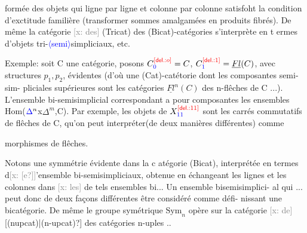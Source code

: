 \documentclass[11pt]{article}
\newcommand{\scanpage}[1]{\par\bigskip\noindent{\small\sffamily[scan #1]}\par}
\newcommand{\mspage}[1]{{\small\sffamily[p.\,#1]}}
\newcommand{\hand}[1]{\textcolor{blue}{#1}}
\newcommand{\inserted}[2][]{\textcolor{blue}{$\langle$#2$\rangle$}}
\newcommand{\deleted}[1]{\textcolor{red}{[\textsf{del.:} #1]}}
\newcommand{\xout}[1]{\textcolor{gray}{[\textsf{x:} #1]}}
\newcommand{\unsure}[1]{[#1?]}
\begin{document}
formée des objets qui ligne par ligne et colonne par colonne satisfoht la
condition d'exctitude familière (transformer sommes amalgamées en produits
fibrés). De même la catégorie \xout{des} (Tricat) des (Bicat)-catégories
s'interprète en t ermes d'objets tri-\inserted[typed]{semi}simpliciaux, etc.

Exemple: soit C une catégorie, posons $C^{\deleted{o}}_{\hand{0}}=C$, $C^{\deleted{1}}_{\hand{1}}=\underline{Fl}(C)$, avec structures
$p_1,p_2$, évidentes (d'où une (Cat)-catétorie dont les composantes semi-sim-%
pliciales supérieures sont les catégories $\underline{Fl}^n(C)$ des n-flêches de C ...).
L'ensemble bi-semisimplicial correspondant a pour composantes les ensembles
Hom($\hand{\Delta}^n$x$\Delta^m$,C). Par exemple, les objets de $X^{\deleted{11}}_{\hand{11}}$ sont les carrés commutatifs
de flêches de C, qu'on peut interpréter(de deux manières différentes) comme

\mspage{\hand{36}}

\clearpage
\scanpage{162-5/37}
morphismes de flêches.

Notons une symmétrie évidente dans la c atégorie (Bicat), interprétée
en termes d\xout{\unsure{e}}'ensemble bi-semisimpliciaux, obtenue en échangeant les lignes
et les colonnes dans \xout{les} de tels ensembles bi... Un ensemble bisemisimplici-%
al qui ... peut donc de deux façons différentes être considéré comme défi-%
nissant une bicatégorie. De même le groupe symétrique $\mathrm{Sym}_n$ opère sur
la catégorie \xout{de} \unsure{(nupcat)|(n-upcat)} des catégories n-uples ..
\end{document}
